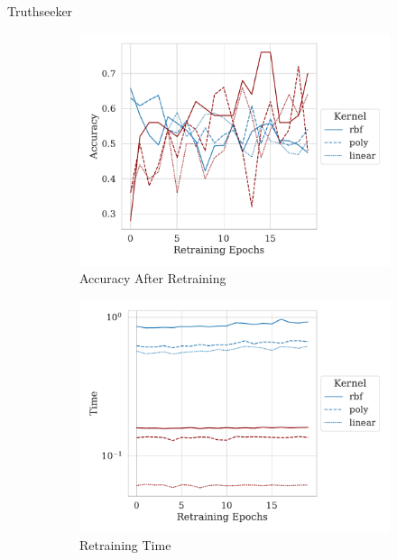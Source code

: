 \documentclass{beamer}
\begin{document}
\begin{frame}{Truthseeker}
    \begin{figure}
     \centering
     \begin{subfigure}{0.4\textwidth}
         \centering
         \includegraphics[width=\textwidth]{./truthseeker/retrain_accuracy.pdf}
         \caption{Accuracy After Retraining}
     \end{subfigure}
     \hfill
     \begin{subfigure}{0.4\textwidth}
         \centering
         \includegraphics[width=\textwidth]{./truthseeker/retrain_time.pdf}
         \caption{Retraining Time}
     \end{subfigure}
     \hfill
     \begin{subfigure}{0.4\textwidth}

\end{subfigure}
\end{figure}
\end{frame}
\end{document}
